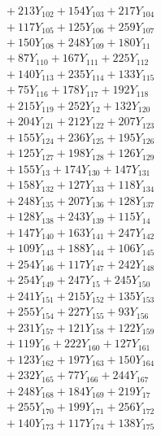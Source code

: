 \documentclass[a4paper,10pt]{article}
\begin{document}
{\begin{align}
&\quad  + 213Y_{102} + 154Y_{103} + 217Y_{104} \\[0.5ex]
&\quad  + 117Y_{105} + 125Y_{106} + 259Y_{107} \\[0.5ex]
&\quad  + 150Y_{108} + 248Y_{109} + 180Y_{11} \\[0.5ex]
&\quad  + 87Y_{110} + 167Y_{111} + 225Y_{112} \\[0.5ex]
&\quad  + 140Y_{113} + 235Y_{114} + 133Y_{115} \\[0.5ex]
&\quad  + 75Y_{116} + 178Y_{117} + 192Y_{118} \\[0.5ex]
&\quad  + 215Y_{119} + 252Y_{12} + 132Y_{120} \\[0.5ex]
&\quad  + 204Y_{121} + 212Y_{122} + 207Y_{123} \\[0.5ex]
&\quad  + 155Y_{124} + 236Y_{125} + 195Y_{126} \\[0.5ex]
&\quad  + 125Y_{127} + 198Y_{128} + 126Y_{129} \\[0.5ex]
&\quad  + 155Y_{13} + 174Y_{130} + 147Y_{131} \\[0.5ex]
&\quad  + 158Y_{132} + 127Y_{133} + 118Y_{134} \\[0.5ex]
&\quad  + 248Y_{135} + 207Y_{136} + 128Y_{137} \\[0.5ex]
&\quad  + 128Y_{138} + 243Y_{139} + 115Y_{14} \\[0.5ex]
&\quad  + 147Y_{140} + 163Y_{141} + 247Y_{142} \\[0.5ex]
&\quad  + 109Y_{143} + 188Y_{144} + 106Y_{145} \\[0.5ex]
&\quad  + 254Y_{146} + 117Y_{147} + 242Y_{148} \\[0.5ex]
&\quad  + 254Y_{149} + 247Y_{15} + 245Y_{150} \\[0.5ex]
&\quad  + 241Y_{151} + 215Y_{152} + 135Y_{153} \\[0.5ex]
&\quad  + 255Y_{154} + 227Y_{155} + 93Y_{156} \\[0.5ex]
&\quad  + 231Y_{157} + 121Y_{158} + 122Y_{159} \\[0.5ex]
&\quad  + 119Y_{16} + 222Y_{160} + 127Y_{161} \\[0.5ex]
&\quad  + 123Y_{162} + 197Y_{163} + 150Y_{164} \\[0.5ex]
&\quad  + 232Y_{165} + 77Y_{166} + 244Y_{167} \\[0.5ex]
&\quad  + 248Y_{168} + 184Y_{169} + 219Y_{17} \\[0.5ex]
&\quad  + 255Y_{170} + 199Y_{171} + 256Y_{172} \\[0.5ex]
&\quad  + 140Y_{173} + 117Y_{174} + 138Y_{175} \\[0.5ex]

\end{align}}
\end{document}
